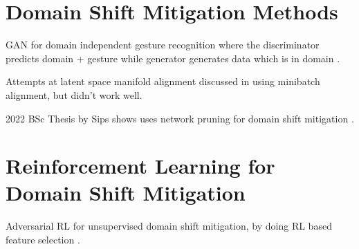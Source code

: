 \section{Domain Shift Mitigation Methods}

GAN for domain independent gesture recognition where the discriminator predicts domain + gesture while generator generates data which is in domain \cite{zinys2021domain}.

Attempts at latent space manifold alignment discussed in \cite{van2022insights} using minibatch alignment, but didn't work well.

2022 BSc Thesis by Sips shows uses network pruning for domain shift mitigation \cite{sips2022impact}.

\section{Reinforcement Learning for Domain Shift Mitigation}

Adversarial RL for unsupervised domain shift mitigation, by doing RL based feature selection \cite{zhang2021adversarial}.